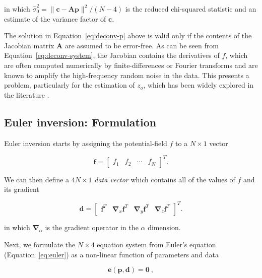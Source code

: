 \noindent
in which
${\hat{\sigma}_0^2} = \|\mathbf{c} - \mathbf{A}\mathbf{p}\|^2 / (N - 4)$
is the reduced chi-squared statistic and an estimate of the variance factor of
$\mathbf{c}$.

The solution in Equation~\ref{eq:deconv-p} above is valid only if the
contents of the Jacobian matrix $\mathbf{A}$ are assumed to be error-free.
As can be seen from Equation~\ref{eq:deconv-system}, the Jacobian contains the
derivatives of $f$, which are often computed numerically by finite-differences
or Fourier transforms and are known to amplify the high-frequency random noise
in the data.
This presents a problem, particularly for the estimation of $z_o$, which has
been widely explored in the literature
\citep{Silva2001,Melo2020,Pasteka2009,Florio2014}.


\subsection{Euler inversion: Formulation}

Euler inversion starts by assigning the potential-field $f$ to a $N \times 1$
vector

\begin{equation}
  \mathbf{f} =
  \begin{bmatrix}
    f_1 & f_2 & \cdots & f_N
  \end{bmatrix}^T.
\end{equation}

\noindent
We can then define a $4N \times 1$ \textit{data vector} which contains all of
the values of $f$ and its gradient

\begin{equation}
  \mathbf{d} =
  \begin{bmatrix}
    \mathbf{f}^T
    & \mathbf{\nabla}_x\mathbf{f}^T
    & \mathbf{\nabla}_y\mathbf{f}^T
    & \mathbf{\nabla}_z\mathbf{f}^T
  \end{bmatrix}^T.
  \label{eq:d}
\end{equation}

\noindent
in which $\mathbf{\nabla}_\alpha$ is the gradient operator in the $\alpha$
dimension.

Next, we formulate the $N \times 4$ equation system from Euler's equation (Equation~\ref{eq:euler}) as a
non-linear function of parameters and data

\begin{equation}
  \mathbf{e}(\mathbf{p}, \mathbf{d}) = \mathbf{0}
  \ ,
  \label{eq:e}
\end{equation}

